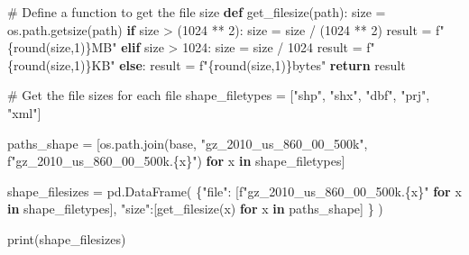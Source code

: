 \documentclass[
  letterpaper,
  DIV=11,
  numbers=noendperiod]{scrartcl}
\newenvironment{Shaded}{\begin{snugshade}}{\end{snugshade}}
\newcommand{\BuiltInTok}[1]{\textcolor[rgb]{0.00,0.23,0.31}{#1}}
\newcommand{\CommentTok}[1]{\textcolor[rgb]{0.37,0.37,0.37}{#1}}
\newcommand{\ControlFlowTok}[1]{\textcolor[rgb]{0.00,0.23,0.31}{\textbf{#1}}}
\newcommand{\DecValTok}[1]{\textcolor[rgb]{0.68,0.00,0.00}{#1}}
\newcommand{\KeywordTok}[1]{\textcolor[rgb]{0.00,0.23,0.31}{\textbf{#1}}}
\newcommand{\NormalTok}[1]{\textcolor[rgb]{0.00,0.23,0.31}{#1}}
\newcommand{\OperatorTok}[1]{\textcolor[rgb]{0.37,0.37,0.37}{#1}}
\newcommand{\SpecialCharTok}[1]{\textcolor[rgb]{0.37,0.37,0.37}{#1}}
\newcommand{\SpecialStringTok}[1]{\textcolor[rgb]{0.13,0.47,0.30}{#1}}
\newcommand{\StringTok}[1]{\textcolor[rgb]{0.13,0.47,0.30}{#1}}
\begin{document}
\begin{Shaded}
\begin{Highlighting}[]
\CommentTok{\# Define a function to get the file size}
\KeywordTok{def}\NormalTok{ get\_filesize(path):}
\NormalTok{    size }\OperatorTok{=}\NormalTok{ os.path.getsize(path)}
    \ControlFlowTok{if}\NormalTok{ size }\OperatorTok{\textgreater{}}\NormalTok{ (}\DecValTok{1024} \OperatorTok{**} \DecValTok{2}\NormalTok{):}
\NormalTok{        size }\OperatorTok{=}\NormalTok{ size }\OperatorTok{/}\NormalTok{ (}\DecValTok{1024} \OperatorTok{**} \DecValTok{2}\NormalTok{)}
\NormalTok{        result }\OperatorTok{=} \SpecialStringTok{f"}\SpecialCharTok{\{}\BuiltInTok{round}\NormalTok{(size,}\DecValTok{1}\NormalTok{)}\SpecialCharTok{\}}\SpecialStringTok{MB"}
    \ControlFlowTok{elif}\NormalTok{ size }\OperatorTok{\textgreater{}} \DecValTok{1024}\NormalTok{:}
\NormalTok{        size }\OperatorTok{=}\NormalTok{ size }\OperatorTok{/} \DecValTok{1024}
\NormalTok{        result }\OperatorTok{=} \SpecialStringTok{f"}\SpecialCharTok{\{}\BuiltInTok{round}\NormalTok{(size,}\DecValTok{1}\NormalTok{)}\SpecialCharTok{\}}\SpecialStringTok{KB"}
    \ControlFlowTok{else}\NormalTok{:}
\NormalTok{        result }\OperatorTok{=} \SpecialStringTok{f"}\SpecialCharTok{\{}\BuiltInTok{round}\NormalTok{(size,}\DecValTok{1}\NormalTok{)}\SpecialCharTok{\}}\SpecialStringTok{bytes"}
    \ControlFlowTok{return}\NormalTok{ result}

\CommentTok{\# Get the file sizes for each file}
\NormalTok{shape\_filetypes }\OperatorTok{=}\NormalTok{ [}\StringTok{"shp"}\NormalTok{, }\StringTok{"shx"}\NormalTok{, }\StringTok{"dbf"}\NormalTok{, }\StringTok{"prj"}\NormalTok{, }\StringTok{"xml"}\NormalTok{]}

\NormalTok{paths\_shape }\OperatorTok{=}\NormalTok{ [os.path.join(base, }\StringTok{"gz\_2010\_us\_860\_00\_500k"}\NormalTok{, }\SpecialStringTok{f"gz\_2010\_us\_860\_00\_500k.}\SpecialCharTok{\{}\NormalTok{x}\SpecialCharTok{\}}\SpecialStringTok{"}\NormalTok{) }\ControlFlowTok{for}\NormalTok{ x }\KeywordTok{in}\NormalTok{ shape\_filetypes]}

\NormalTok{shape\_filesizes }\OperatorTok{=}\NormalTok{ pd.DataFrame(}
\NormalTok{  \{}\StringTok{"file"}\NormalTok{: [}\SpecialStringTok{f"gz\_2010\_us\_860\_00\_500k.}\SpecialCharTok{\{}\NormalTok{x}\SpecialCharTok{\}}\SpecialStringTok{"} \ControlFlowTok{for}\NormalTok{ x }\KeywordTok{in}\NormalTok{ shape\_filetypes],}
  \StringTok{"size"}\NormalTok{:[get\_filesize(x) }\ControlFlowTok{for}\NormalTok{ x }\KeywordTok{in}\NormalTok{ paths\_shape]}
\NormalTok{  \}}
\NormalTok{)}

\BuiltInTok{print}\NormalTok{(shape\_filesizes)}
\end{Highlighting}
\end{Shaded}
\end{document}
